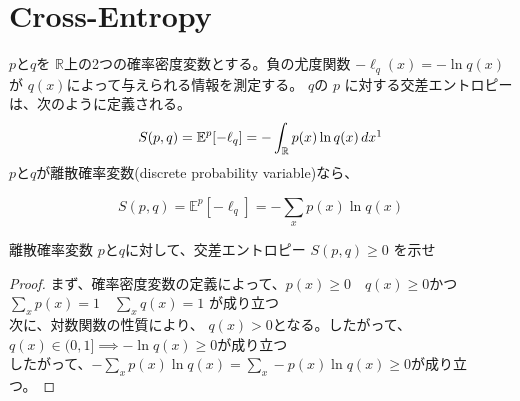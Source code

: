 \documentclass[a4paper]{jsarticle}%
\begin{document}
\maketitle
\vspace{-0.4cm}
\begin{figure}[H] 
  \centering
  \label{fig:my_label}
\end{figure}
\section{\textbf{Cross-Entropy}}
\thispagestyle{plain}
\begin{dfn}\label{def:cross-entropy}
$p$と$q$を $ \mathbb{R} $上の2つの確率密度変数とする。負の尤度関数 $ -\ell_{q}(x)=-\ln q(x) $が $ q(x) $によって与えられる情報を測定する。
$q $の $ p $ に対する交差エントロピーは、次のように定義される。\\
\begin{equation}
  S(p, q) = \mathbb{E}^p[-\ell_q] = -\int_{\mathbb{R}} p(x) \ln q(x) \, dx\footnotemark[1] \label{eq2}
\end{equation}
$p$と$q$が離散確率変数(discrete probability variable)なら、

\begin{equation}
  S(p, q) = \mathbb{E}^p[-\ell_q] = -\sum_{x} p(x) \ln q(x)
\end{equation}


\begin{exercise}
  離散確率変数 $p$と$q$に対して、交差エントロピー $S(p, q)\geq 0$ を示せ\\
\end{exercise}

\begin{proof}
まず、確率密度変数の定義によって、$p(x)\geq 0\quad q(x)\geq 0$かつ $ \displaystyle\sum_{x}p(x)=1\quad \displaystyle\sum_{x}q(x)=1 $  が成り立つ\\  
次に、対数関数の性質により、 $ q(x)>0 $となる。したがって、$q(x)\in (0,1]\implies -\ln q(x)\geq 0$が成り立つ\\
したがって、$-\sum_{x} p(x) \ln q(x) = \sum_{x} -p(x) \ln q(x)\geq 0$が成り立つ。
\end{proof}
\end{dfn}
\end{document}
